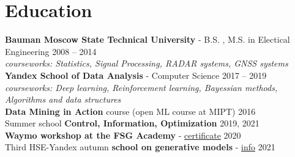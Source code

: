 \section*{\sectionformat Education}
\textbf{Bauman Moscow State Technical University} - B.S. , M.S. in Electical Engineering \hfill 2008 -- 2014 \\
\textit{courseworks: Statistics, Signal Processing, RADAR systems, GNSS systems} \\
% 
\textbf{Yandex School of Data Analysis} - Computer Science \hfill 2017 -- 2019 \\
\textit{courseworks: Deep learning, Reinforcement learning, Bayessian methods, Algorithms and data structures} \\
% 
\textbf{Data Mining in Action} course (open ML course at MIPT) \hfill    2016         \\
% 
Summer school \textbf{Control, Information, Optimization}                                                                                             \hfill  2019, 2021 \\
%
\textbf{Waymo workshop at the FSG Academy} - \href{https://drive.google.com/file/d/1-WxECccxBrRWIvEt9WQeXKTueiF658r7/view?usp=sharing}{certificate}   \hfill  2020       \\
% 
Third HSE-Yandex autumn \textbf{school on generative models} - \href{https://indico.cern.ch/event/1082512/timetable/#20211123}{info}                  \hfill  2021
\nolinebreak